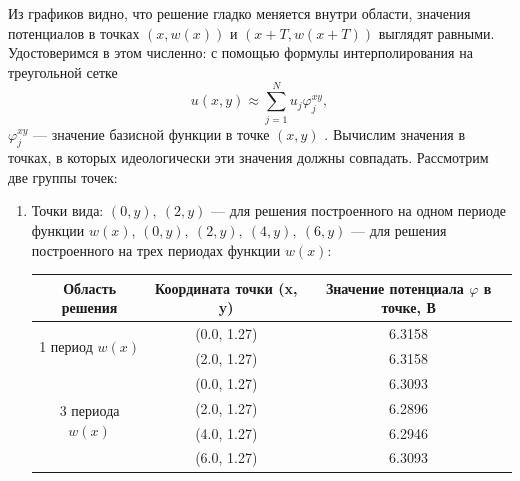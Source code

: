 \documentclass[12pt, a4paper]{article}
\renewcommand{\phi}{\varphi}
\begin{document}
				Из графиков видно, что решение гладко меняется внутри области, значения потенциалов в точках
				$(x, w(x))$ и $(x + T, w(x + T))$ выглядят равными. Удостоверимся в этом численно: с помощью формулы интерполирования на треугольной сетке 
				\begin{equation*}
					u(x, y) \approx \sum_{j = 1}^{N} u_{j} \phi_{j}^{xy}, 
				\end{equation*}
				$\phi_{j}^{xy}$ --- значение базисной функции в точке $(x, y)$ \cite{Galanin}.
				Вычислим значения в точках, в которых идеологически эти значения должны совпадать. 
				Рассмотрим две группы точек:
				\begin{enumerate}
					\item Точки вида: $(0, y),\ (2, y)$ --- для решения построенного на одном периоде функции $w(x)$,
					$(0, y),\ (2, y),\ (4, y),\ (6, y)$ --- для решения построенного на трех периодах функции $w(x)$:	
				
					\begin{table}[!h]
						\centering
						\begin{tabular}{|c|c|c|}
							\hline
							Область решения
							& Координата точки (x, y)
							& Значение потенциала $\phi$ в точке, В\\
							
							\hline
							\hline
							
							\multirow{2}{*}{1 период $w(x)$}  
							& (0.0, 1.27)                                                      
							& 6.3158	\\ \cline{2-3} 
							
							& (2.0, 1.27)                                                      
							& 6.3158	\\ \hline
							
							
							\multirow{4}{*}{3 периода $w(x)$} 
							& (0.0, 1.27)                                                     
							& 6.3093	\\ \cline{2-3} 
							
							& (2.0, 1.27)                                                      
							& 6.2896	\\ \cline{2-3} 
							
							& (4.0, 1.27)                                                      
							& 6.2946    \\ \cline{2-3} 
							
							& (6.0, 1.27)                                                      
							& 6.3093	
							\\ 
							

\end{tabular}
\end{table}
\end{enumerate}
\end{document}
